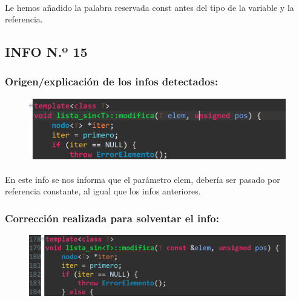 			\paragraph{}Le hemos añadido la palabra reservada const antes del tipo de la variable y la referencia.
			
	\subsection{INFO N.º 15}
	
		\subsubsection{Origen/explicación de los infos detectados:}
		
			\begin{figure}[H]
				\centering
				\includegraphics[scale=0.55]{img/esteban22.png}
				\label{esteban22}
			\end{figure}
			
			\paragraph{}En este info se nos informa que el parámetro elem, debería ser pasado por referencia constante, al igual que los infos anteriores.
			
		\subsubsection{Corrección realizada para solventar el info:}
		
			\begin{figure}[H]
				\centering
				\includegraphics[scale=0.55]{img/esteban23.png}
				\label{esteban23}
			\end{figure}
		
